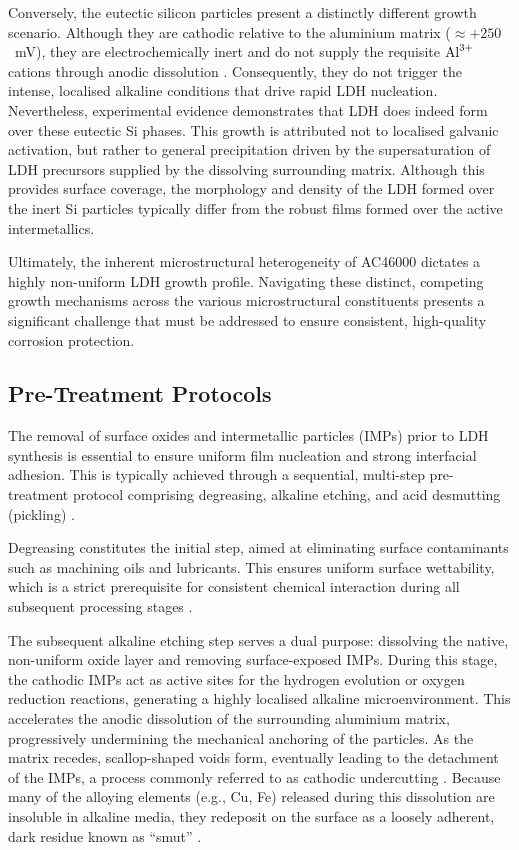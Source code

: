 \documentclass[11pt,twoside,a4paper,final]{report}
\begin{document}
Conversely, the eutectic silicon particles present a distinctly different growth scenario. Although they are cathodic relative to the aluminium matrix ($\approx +250$~mV), they are electrochemically inert and do not supply the requisite $\ce{Al^{3+}}$ cations through anodic dissolution \cite{Gudic2024, DelOlmo2025}. Consequently, they do not trigger the intense, localised alkaline conditions that drive rapid LDH nucleation. Nevertheless, experimental evidence demonstrates that LDH does indeed form over these eutectic Si phases. This growth is attributed not to localised galvanic activation, but rather to general precipitation driven by the supersaturation of LDH precursors supplied by the dissolving surrounding matrix. Although this provides surface coverage, the morphology and density of the LDH formed over the inert Si particles typically differ from the robust films formed over the active intermetallics. 

Ultimately, the inherent microstructural heterogeneity of AC46000 dictates a highly non-uniform LDH growth profile. Navigating these distinct, competing growth mechanisms across the various microstructural constituents presents a significant challenge that must be addressed to ensure consistent, high-quality corrosion protection.

\subsection{Pre-Treatment Protocols}
\label{subsec:pre_treatment}

The removal of surface oxides and intermetallic particles (IMPs) prior to LDH synthesis is essential to ensure uniform film nucleation and strong interfacial adhesion. This is typically achieved through a sequential, multi-step pre-treatment protocol comprising degreasing, alkaline etching, and acid desmutting (pickling) \cite{MartinezViademonte2020}.

Degreasing constitutes the initial step, aimed at eliminating surface contaminants such as machining oils and lubricants. This ensures uniform surface wettability, which is a strict prerequisite for consistent chemical interaction during all subsequent processing stages \cite{MartinezViademonte2020}. 

The subsequent alkaline etching step serves a dual purpose: dissolving the native, non-uniform oxide layer and removing surface-exposed IMPs. During this stage, the cathodic IMPs act as active sites for the hydrogen evolution or oxygen reduction reactions, generating a highly localised alkaline microenvironment. This accelerates the anodic dissolution of the surrounding aluminium matrix, progressively undermining the mechanical anchoring of the particles. As the matrix recedes, scallop-shaped voids form, eventually leading to the detachment of the IMPs, a process commonly referred to as cathodic undercutting \cite{Nelson2001, Jin2020}. Because many of the alloying elements (e.g., Cu, Fe) released during this dissolution are insoluble in alkaline media, they redeposit on the surface as a loosely adherent, dark residue known as ``smut'' \cite{MartinezViademonte2020, Nelson2001, Jin2020}.
\end{document}
